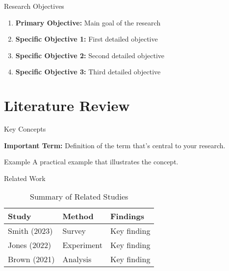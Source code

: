 \documentclass[aspectratio=169]{beamer}
\begin{document}
	\begin{frame}{Research Objectives}
		\begin{enumerate}
			\item<1-> \textbf{Primary Objective:} Main goal of the research
			\item<2-> \textbf{Specific Objective 1:} First detailed objective
			\item<3-> \textbf{Specific Objective 2:} Second detailed objective
			\item<4-> \textbf{Specific Objective 3:} Third detailed objective
		\end{enumerate}
		
		\vspace{1em}
		
	\end{frame}
	
	\section{Literature Review}
	
	\begin{frame}{Key Concepts}
		\begin{definition}
			\textbf{Important Term:} Definition of the term that's central to your research.
		\end{definition}
		
		\vspace{1em}
		
		\begin{exampleblock}{Example}
			A practical example that illustrates the concept.
		\end{exampleblock}
	\end{frame}
	
	\begin{frame}{Related Work}
		\begin{table}
			\centering
			\caption{Summary of Related Studies}
			\begin{tabular}{lll}
				\toprule
				\textbf{Study} & \textbf{Method} & \textbf{Findings} \\
				\midrule
				Smith (2023) & Survey & Key finding \\
				Jones (2022) & Experiment & Key finding \\
				Brown (2021) & Analysis & Key finding \\
				\bottomrule
			\end{tabular}
		\end{table}
	\end{frame}
	
\end{document}

